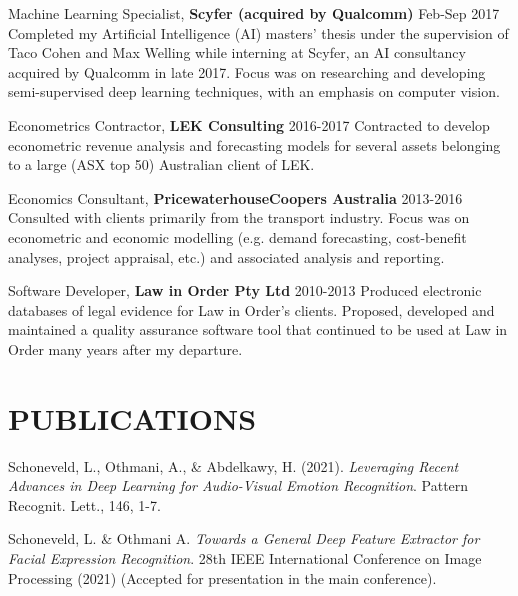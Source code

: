 \documentclass[margin]{res}
\begin{document}
\begin{resume}
		{Machine Learning Specialist,} {\bf Scyfer (acquired by Qualcomm)} \hfill Feb-Sep 2017\vspace{1mm}\newline
		Completed my Artificial Intelligence (AI) masters' thesis under the supervision of Taco Cohen and Max Welling while interning at Scyfer, an AI consultancy acquired by Qualcomm in late 2017. Focus was on researching and developing semi-supervised deep learning techniques, with an emphasis on computer vision.
		
		{Econometrics Contractor,} {\bf LEK Consulting} \hfill 2016-2017\vspace{1mm}\newline
		Contracted to develop econometric revenue analysis and forecasting models for several assets belonging to a large (ASX top 50) Australian client of LEK.
		
		{Economics Consultant,} {\bf PricewaterhouseCoopers Australia} \hfill 2013-2016\vspace{1mm}\newline
		Consulted with clients primarily from the transport industry. Focus was on econometric and economic modelling (e.g. demand forecasting, cost-benefit analyses, project appraisal, etc.) and associated analysis and reporting.
		
		{Software Developer,} {\bf Law in Order Pty Ltd} \hfill 2010-2013\vspace{1mm}\newline
		Produced electronic databases of legal evidence for Law in Order's clients. Proposed, developed and maintained a quality assurance software tool that continued to be used at Law in Order many years after my departure.		
		
		\section{PUBLICATIONS}
		
		Schoneveld, L., Othmani, A., \& Abdelkawy, H. (2021). \textit{Leveraging Recent Advances in Deep Learning for Audio-Visual Emotion Recognition}. Pattern Recognit. Lett., 146, 1-7.
		
		Schoneveld, L. \& Othmani A. 
		\textit{Towards a General Deep Feature Extractor for Facial Expression Recognition}. 28th IEEE International Conference on Image Processing (2021) (Accepted for presentation in the main conference).
		

\end{resume}
\end{document}
